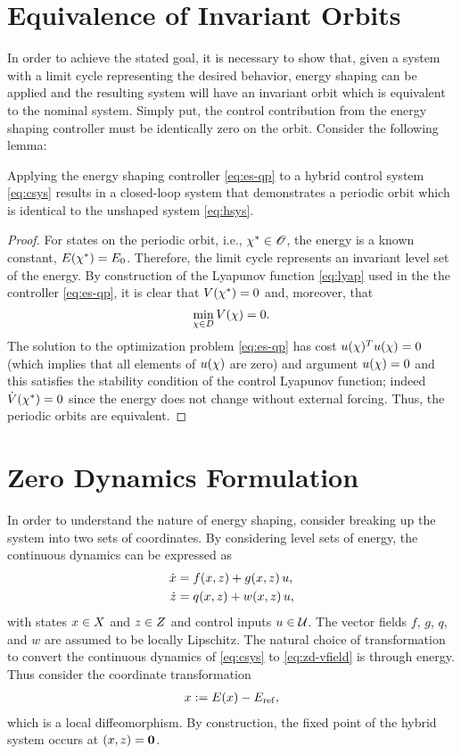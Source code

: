 \documentclass[twocolumn]{article}
\begin{document}
\section{Equivalence of Invariant Orbits}

In order to achieve the stated goal, it is necessary to show that, given a system with a limit cycle representing the desired behavior, energy shaping can be applied and the resulting system will have an invariant orbit which is equivalent to the nominal system. Simply put, the control contribution from the energy shaping controller must be identically zero on the orbit. Consider the following lemma:

\begin{lemma}
  Applying the energy shaping controller \eqref{eq:es-qp} to a hybrid control system \eqref{eq:csys} results in a closed-loop system that demonstrates a periodic orbit which is identical to the unshaped system \eqref{eq:hsys}.
\end{lemma}

\begin{proof}
  For states on the periodic orbit, i.e., $\chi^{*} \in \mathscr{O}$, the energy is a known constant, $E(\chi^{*}) = E_{0}$.
  Therefore, the limit cycle represents an invariant level set of the energy.
  By construction of the Lyapunov function \eqref{eq:lyap} used in the the controller \eqref{eq:es-qp}, it is clear that $V(\chi^{*}) = 0$ and, moreover, that $$\min_{\chi \in D} V(\chi) = 0.$$
  The solution to the optimization problem \eqref{eq:es-qp} has cost $u(\chi)^T u(\chi) = 0$ (which implies that all elements of $u(\chi)$ are zero) and argument $u(\chi) = 0$ and this satisfies the stability condition of the control Lyapunov function; indeed ${\dot V}(\chi^{*}) = 0$ since the energy does not change without external forcing.
  Thus, the periodic orbits are equivalent.
\end{proof}

\section{Zero Dynamics Formulation}

In order to understand the nature of energy shaping, consider breaking up the system into two sets of coordinates.
%
By considering level sets of energy, the continuous dynamics can be expressed as
\begin{align}
  \nonumber
  \dot {x} &= f(x, z) + g(x, z) \, u,\\
  \dot {z} &= q(x, z) + w(x, z) \, u,
  \label{eq:zd-vfield}
\end{align}
%
with states $x \in X$ and $z \in Z$ and control inputs $u \in \mathcal{U}$.
%
The vector fields $f$, $g$, $q$, and $w$ are assumed to be locally Lipschitz.
%
The natural choice of transformation to convert the continuous dynamics of \eqref{eq:csys} to \eqref{eq:zd-vfield} is through energy.
%
Thus consider the coordinate transformation
\begin{align}
  x := E(x) - E_{\mathrm{ref}},
\end{align}
which is a local diffeomorphism.
%
By construction, the fixed point of the hybrid system occurs at $(x, z) = {\mathbf 0}$.
%
\end{document}
